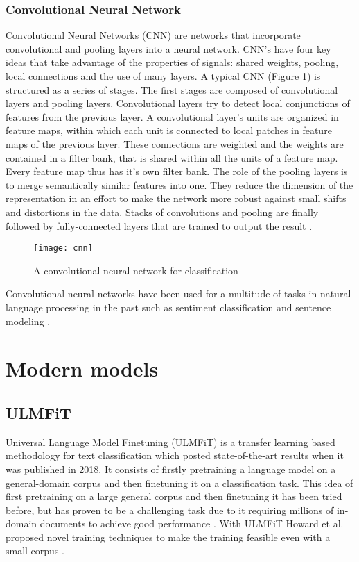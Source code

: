 \subsubsection{Convolutional Neural Network}\label{CNN}
Convolutional Neural Networks (CNN) are networks that incorporate convolutional and pooling layers into a neural network.
CNN's have four key ideas that take advantage of the properties of signals: shared weights, pooling, local connections and the use of many layers.
A typical CNN (Figure \ref{fig:cnn}) is structured as a series of stages.
The first stages are composed of convolutional layers and pooling layers.
Convolutional layers try to detect local conjunctions of features from the previous layer.
A convolutional layer's units are organized in feature maps, within which each unit is connected to local patches in feature maps of the previous layer.
These connections are weighted and the weights are contained in a filter bank, that is shared within all the units of a feature map.
Every feature map thus has it's own filter bank.
The role of the pooling layers is to merge semantically similar features into one.
They reduce the dimension of the representation in an effort to make the network more robust against small shifts and distortions in the data.
Stacks of convolutions and pooling are finally followed by fully-connected layers that are trained to output the result \cite{lecun2015}.

\begin{figure}[t]
\texttt{[image: cnn]}
\centering
\caption{A convolutional neural network for classification}
\label{fig:cnn}
\end{figure}

Convolutional neural networks have been used for a multitude of tasks in natural language processing in the past such as sentiment classification and sentence modeling \cite{kalchbrenner2014}.


\section{Modern models} \label{Modern models}

\subsection{ULMFiT} \label{ULMFiT}
Universal Language Model Finetuning (ULMFiT) is a transfer learning based methodology for text classification which posted state-of-the-art results when it was published in 2018.
It consists of firstly pretraining a language model on a general-domain corpus and then finetuning it on a classification task.
This idea of first pretraining on a large general corpus and then finetuning it has been tried before, but has proven to be a challenging task due to it requiring millions of in-domain documents to achieve good performance \cite{dai2015}.
With ULMFiT Howard et al. proposed novel training techniques to make the training feasible even with a small corpus \cite{howard2018}.

